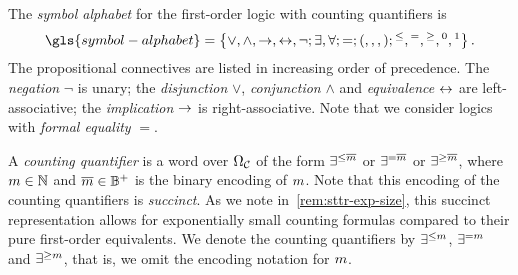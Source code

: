 
The \emph{symbol alphabet} for the first-order logic with counting quantifiers
is
\[
  \gls{symbol-alphabet} = \set{\allconns, \lnot; \allQs;
  =; (,,,); {}^{\leq}, {}^{=}, {}^{\geq}, {}^0, {}^1}.
\]
The propositional connectives are listed in increasing order of precedence.
The \emph{negation} $\lnot$ is unary;
the \emph{disjunction} $\lor$, \emph{conjunction} $\land$ and \emph{equivalence}
$\leftrightarrow$ are left-associative; the \emph{implication} $\rightarrow$ is
right-associative.
Note that we consider logics with \emph{formal equality} $=$.

A \emph{counting quantifier} is a word over $\Omega_{\mathcal{C}}$ of the form
$\exists^{\leq\overline{m}}$ or $\exists^{=\overline{m}}$ or $\exists^{\geq\overline{m}}$,
where $m \in \mathbb{N}$ and $\overline{m} \in \mathbb{B}^+$ is the binary encoding of
$m$. Note that this encoding of the counting quantifiers is \emph{succinct}.
As we note in~\cref{rem:sttr-exp-size}, this succinct representation allows for
exponentially small counting formulas compared to their pure first-order
equivalents.
We denote the counting quantifiers by $\exists^{\leq m}$, $\exists^{=m}$ and
$\exists^{\geq m}$, that is, we omit the encoding notation for $m$.